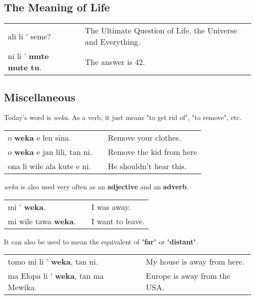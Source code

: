 \subsection*{The Meaning of Life}

\begin{supertabular}{p{5,5cm}|ll}
ali li ' seme? &&  The Ultimate Question of Life, the Universe and Everything. \\
ni li ' \textbf{mute mute tu}.  && The answer is 42. \\
\end{supertabular} 

%
\newpage
\subsection*{Miscellaneous}
%
Today's word is \textit{weka}. 
As a verb, it just means "to get rid of", "to remove", etc. 

\begin{supertabular}{p{5,5cm}|ll}
o \textbf{weka} e len sina. && Remove your clothes. \\
o \textbf{weka} e jan lili, tan ni. && Remove the kid from here \\ 
ona li wile ala kute e ni. && He shouldn't hear this. \\ 
\end{supertabular} 

\textit{weka} is also used very often as an \textbf{adjective} and an \textbf{adverb}. 

\begin{supertabular}{p{5,5cm}|ll}
mi ' \textbf{weka}. && I was away. \\
mi wile tawa \textbf{weka}. && I want to leave. \\
\end{supertabular} 

It can also be used to mean the equivalent of "\textbf{far}" or "\textbf{distant}". 

\begin{supertabular}{p{5,5cm}|ll}
tomo mi li ' \textbf{weka}, tan ni. && My house is away from here. \\
ma Elopa li ' \textbf{weka}, tan ma Mewika. && Europe is away from the USA. \\
\end{supertabular} 

